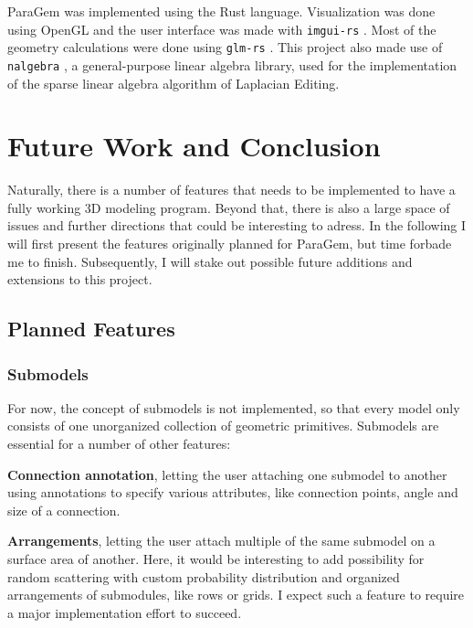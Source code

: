 \documentclass[english]{article}
\begin{document}

ParaGem was implemented using the Rust language. Visualization was done using OpenGL and the user interface was made with \texttt{imgui-rs} \cite{imguirs}. Most of the geometry calculations were done using \texttt{glm-rs} \cite{glmrs}. This project also made use of \texttt{nalgebra} \cite{nalgebra}, a general-purpose linear algebra library, used for the implementation of the sparse linear algebra algorithm of Laplacian Editing.


\pagebreak

\section{Future Work and Conclusion} \label{section_future_work}


Naturally, there is a number of features that needs to be implemented to have a fully working 3D modeling program. Beyond that, there is also a large space of issues and further directions that could be interesting to adress. In the following I will first present the features originally planned for ParaGem, but time forbade me to finish. Subsequently, I will stake out possible future additions and extensions to this project.

\subsection{Planned Features}

\subsubsection{Submodels}


For now, the concept of submodels is not implemented, so that every model only consists of one unorganized collection of geometric primitives. Submodels are essential for a number of other features:

\textbf{Connection annotation}, letting the user attaching one submodel to another using annotations to specify various attributes, like connection points, angle and size of a connection.

\textbf{Arrangements}, letting the user attach multiple of the same submodel on a surface area of another. Here, it would be interesting to add possibility for random scattering with custom probability distribution and organized arrangements of submodules, like rows or grids. I expect such a feature to require a major implementation effort to succeed.
\end{document}
